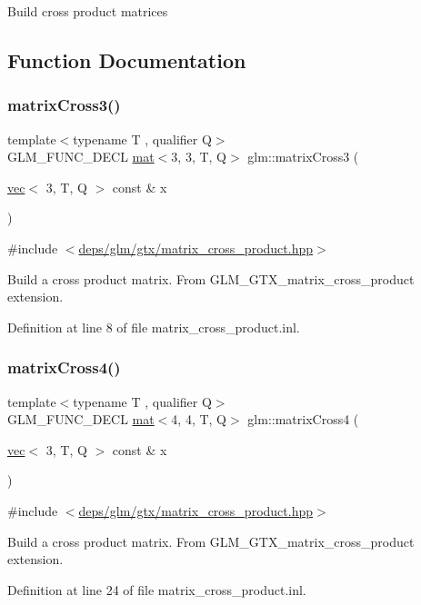 Build cross product matrices 

\subsection{Function Documentation}
\mbox{\label{group__gtx__matrix__cross__product_ga5802386bb4c37b3332a3b6fd8b6960ff}} 
\subsubsection{\texorpdfstring{matrix\+Cross3()}{matrixCross3()}}
{\footnotesize\ttfamily template$<$typename T , qualifier Q$>$ \\
G\+L\+M\+\_\+\+F\+U\+N\+C\+\_\+\+D\+E\+CL \hyperlink{structglm_1_1mat}{mat}$<$3, 3, T, Q$>$ glm\+::matrix\+Cross3 (\begin{DoxyParamCaption}\item[{\hyperlink{structglm_1_1vec}{vec}$<$ 3, T, Q $>$ const \&}]{x }\end{DoxyParamCaption})}



{\ttfamily \#include $<$\hyperlink{matrix__cross__product_8hpp}{deps/glm/gtx/matrix\+\_\+cross\+\_\+product.\+hpp}$>$}

Build a cross product matrix. From G\+L\+M\+\_\+\+G\+T\+X\+\_\+matrix\+\_\+cross\+\_\+product extension. 

Definition at line 8 of file matrix\+\_\+cross\+\_\+product.\+inl.

\mbox{\label{group__gtx__matrix__cross__product_ga20057fff91ddafa102934adb25458cde}} 
\subsubsection{\texorpdfstring{matrix\+Cross4()}{matrixCross4()}}
{\footnotesize\ttfamily template$<$typename T , qualifier Q$>$ \\
G\+L\+M\+\_\+\+F\+U\+N\+C\+\_\+\+D\+E\+CL \hyperlink{structglm_1_1mat}{mat}$<$4, 4, T, Q$>$ glm\+::matrix\+Cross4 (\begin{DoxyParamCaption}\item[{\hyperlink{structglm_1_1vec}{vec}$<$ 3, T, Q $>$ const \&}]{x }\end{DoxyParamCaption})}



{\ttfamily \#include $<$\hyperlink{matrix__cross__product_8hpp}{deps/glm/gtx/matrix\+\_\+cross\+\_\+product.\+hpp}$>$}

Build a cross product matrix. From G\+L\+M\+\_\+\+G\+T\+X\+\_\+matrix\+\_\+cross\+\_\+product extension. 

Definition at line 24 of file matrix\+\_\+cross\+\_\+product.\+inl.

